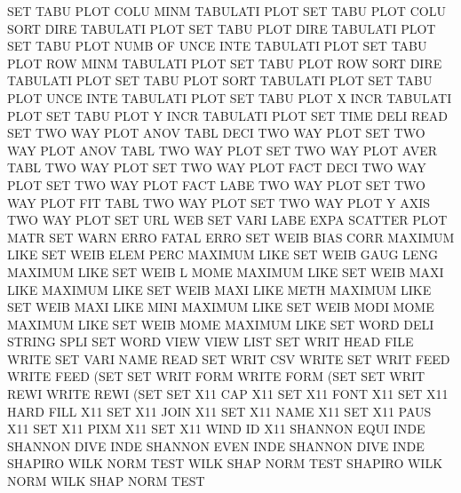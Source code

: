 SET      TABU PLOT COLU MINM            TABULATI PLOT
SET      TABU PLOT COLU SORT DIRE       TABULATI PLOT
SET      TABU PLOT DIRE                 TABULATI PLOT
SET      TABU PLOT NUMB OF   UNCE INTE  TABULATI PLOT
SET      TABU PLOT ROW  MINM            TABULATI PLOT
SET      TABU PLOT ROW  SORT DIRE       TABULATI PLOT
SET      TABU PLOT SORT                 TABULATI PLOT
SET      TABU PLOT UNCE INTE            TABULATI PLOT
SET      TABU PLOT X    INCR            TABULATI PLOT
SET      TABU PLOT Y    INCR            TABULATI PLOT
SET      TIME DELI                      READ
SET      TWO  WAY  PLOT ANOV TABL DECI  TWO      WAY  PLOT
SET      TWO  WAY  PLOT ANOV TABL       TWO      WAY  PLOT
SET      TWO  WAY  PLOT AVER TABL       TWO      WAY  PLOT
SET      TWO  WAY  PLOT FACT DECI       TWO      WAY  PLOT
SET      TWO  WAY  PLOT FACT LABE       TWO      WAY  PLOT
SET      TWO  WAY  PLOT FIT  TABL       TWO      WAY  PLOT
SET      TWO  WAY  PLOT Y    AXIS       TWO      WAY  PLOT
SET      URL                            WEB
SET      VARI LABE EXPA                 SCATTER  PLOT MATR
SET      WARN ERRO                      FATAL    ERRO
SET      WEIB BIAS CORR                 MAXIMUM  LIKE
SET      WEIB ELEM PERC                 MAXIMUM  LIKE
SET      WEIB GAUG LENG                 MAXIMUM  LIKE
SET      WEIB L    MOME                 MAXIMUM  LIKE
SET      WEIB MAXI LIKE                 MAXIMUM  LIKE
SET      WEIB MAXI LIKE METH            MAXIMUM  LIKE
SET      WEIB MAXI LIKE MINI            MAXIMUM  LIKE
SET      WEIB MODI MOME                 MAXIMUM  LIKE
SET      WEIB MOME                      MAXIMUM  LIKE
SET      WORD DELI                      STRING   SPLI
SET      WORD VIEW VIEW                 LIST
SET      WRIT HEAD FILE                 WRITE
SET      VARI NAME                      READ
SET      WRIT CSV                       WRITE
SET      WRIT FEED                      WRITE    FEED (SET
SET      WRIT FORM                      WRITE    FORM (SET
SET      WRIT REWI                      WRITE    REWI (SET
SET      X11  CAP                       X11
SET      X11  FONT                      X11
SET      X11  HARD FILL                 X11
SET      X11  JOIN                      X11
SET      X11  NAME                      X11
SET      X11  PAUS                      X11
SET      X11  PIXM                      X11
SET      X11  WIND ID                   X11
SHANNON  EQUI INDE                      SHANNON  DIVE INDE
SHANNON  EVEN INDE                      SHANNON  DIVE INDE
SHAPIRO  WILK NORM TEST                 WILK     SHAP NORM TEST
SHAPIRO  WILK NORM                      WILK     SHAP NORM TEST
